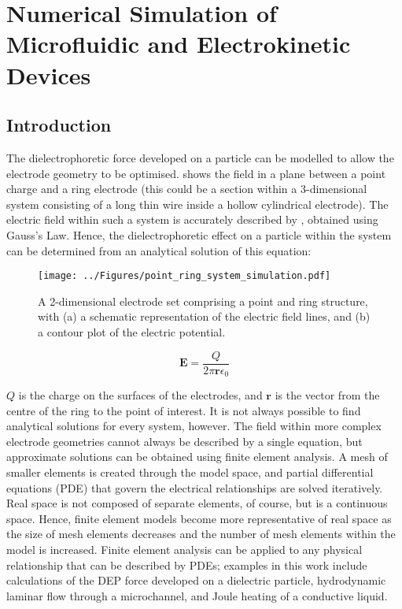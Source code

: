 \chapter{Numerical Simulation of Microfluidic and Electrokinetic Devices} 
\label{Chapter:NumericalSimulation} 

\section{Introduction}
The dielectrophoretic force developed on a particle can be modelled to allow the electrode geometry to be optimised.  shows the field in a plane between a point charge and a ring electrode (this could be a section within a 3-dimensional system consisting of a long thin wire inside a hollow cylindrical electrode). The electric field within such a system is accurately described by , obtained using Gauss's Law. Hence, the dielectrophoretic effect on a particle within the system can be determined from an analytical solution of this equation:

\begin{figure}
	\centering
		\texttt{[image: ../Figures/point\_ring\_system\_simulation.pdf]}
	\caption[A 2-dimensional electrode set comprising a point and ring structure.]{A 2-dimensional electrode set comprising a point and ring structure, with (a) a schematic representation of the electric field lines, and (b) a contour plot of the electric potential.}
	\label{fig:point_ring_system_simulation}
\end{figure}

\begin{equation}
\textbf{E} = \frac{Q}{2 \pi \textbf{r} \epsilon_{0}}
 \label{eqn:e_field_point_ring}
\end{equation}

$Q$ is the charge on the surfaces of the electrodes, and $\textbf{r}$ is the vector from the centre of the ring to the point of interest. It is not always possible to find analytical solutions for every system, however. The field within more complex electrode geometries cannot always be described by a single equation, but approximate solutions can be obtained using finite element analysis. A mesh of smaller elements is created through the model space, and partial differential equations (PDE) that govern the electrical relationships are solved iteratively. Real space is not composed of separate elements, of course, but is a continuous space. Hence, finite element models become more representative of real space as the size of mesh elements decreases and the number of mesh elements within the model is increased. Finite element analysis can be applied to any physical relationship that can be described by PDEs; examples in this work include calculations of the DEP force developed on a dielectric particle, hydrodynamic laminar flow through a microchannel, and Joule heating of a conductive liquid.

